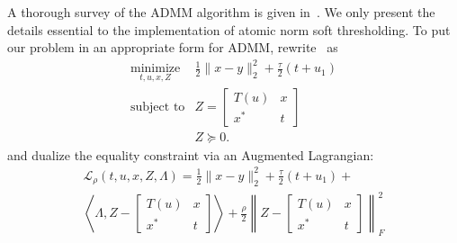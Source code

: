 A thorough survey of the ADMM algorithm is given in~\cite{admm2011}. We only
present the details essential to the implementation of atomic norm soft
thresholding. To put our problem in an appropriate form for ADMM,
rewrite~ as
\begin{equation*}
\begin{array}{ll}
\operatorname*{minimize}_{t, u, x,Z} & \frac{1}{2} \|x - y\|_2^2 + \frac{\tau}{2}(t + u_1) \\
\operatorname{subject\ to}
& Z=\begin{bmatrix}
  T(u) & x \\
  x^* & t
 \end{bmatrix} \\
& Z\succeq 0.\end{array} 
\end{equation*}
and dualize the equality constraint via an Augmented Lagrangian:
\begin{align*}
\mathcal{L}_\rho (t,u,x,Z, \Lambda)= \frac{1}{2} \|x - y\|_2^2 + \frac{\tau}{2}(t +  u_1) + \\
\left\langle   \Lambda, Z-\begin{bmatrix}
  T(u) & x \\
  x^* & t
 \end{bmatrix} \right\rangle +
  \frac{\rho}{2} \left\| Z-\begin{bmatrix}
  T(u) & x \\
  x^* & t
 \end{bmatrix} \right\|_F^2
\end{align*}

